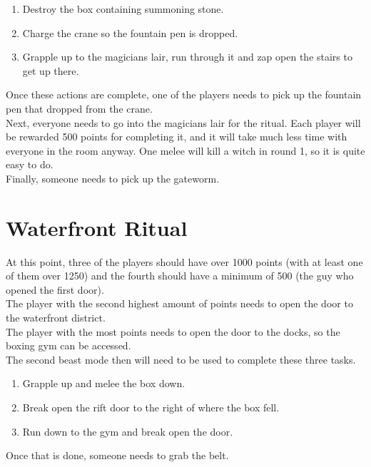 \documentclass[11pt]{article} %
\begin{document}
	\begin{enumerate}
		\item Destroy the box containing summoning stone.
		\item Charge the crane so the fountain pen is dropped.
		\item Grapple up to the magicians lair, run through it and zap open the stairs to get up there.
	\end{enumerate}

	Once these actions are complete, one of the players needs to pick up the fountain pen that dropped from the crane. \\

	Next, everyone needs to go into the magicians lair for the ritual. Each player will be rewarded 500 points for completing it, and it will take much less time with everyone in the room anyway. One melee will kill a witch in round 1, so it is quite easy to do. \\

	Finally, someone needs to pick up the gateworm.

\newpage
\section{Waterfront Ritual}

	At this point, three of the players should have over 1000 points (with at least one of them over 1250) and the fourth should have a minimum of 500 (the guy who opened the first door). \\

	The player with the second highest amount of points needs to open the door to the waterfront district. \\

	The player with the most points needs to open the door to the docks, so the boxing gym can be accessed. \\

	The second beast mode then will need to be used to complete these three tasks.

	\begin{enumerate}
		\item Grapple up and melee the box down.
		\item Break open the rift door to the right of where the box fell.
		\item Run down to the gym and break open the door.
	\end{enumerate}

	Once that is done, someone needs to grab the belt. \\
\end{document}
